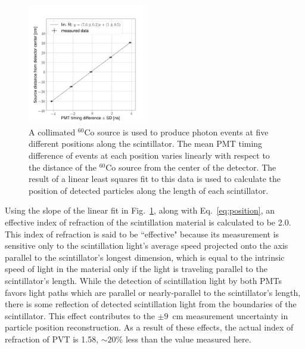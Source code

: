 \documentclass[%
 reprint,
 amsmath,amssymb,
 aps,
 nofootinbib
]{revtex4-1}
\begin{document}
\begin{figure}[]
    \centering    
    \includegraphics[width = 0.47\textwidth]{PMTDifference.png}
    \caption{
    A collimated $^{60}$Co source is used to produce photon events at five different positions along the scintillator.
    The mean PMT timing difference of events at each position varies linearly with respect to the distance of the $^{60}$Co source from the center of the detector. 
    The result of a linear least squares fit to this data is used to calculate the position of detected particles along the length of each scintillator.
    }
    \label{fig:PMTDifference}
\end{figure}

Using the slope of the linear fit in Fig.~\ref{fig:PMTDifference}, along with Eq.~\ref{eq:position}, an effective index of refraction of the scintillation material is calculated to be 2.0.
This index of refraction is said to be ``effective" because its measurement is sensitive only to the scintillation light's average speed projected onto the axis parallel to the scintillator's longest dimension, which is equal to the intrinsic speed of light in the material only if the light is traveling parallel to the scintillator's length.
While the detection of scintillation light by both PMTs favors light paths which are parallel or nearly-parallel to the scintillator's length, there is some reflection of detected scintillation light from the boundaries of the scintillator.
This effect contributes to the $\pm9$~cm measurement uncertainty in particle position reconstruction.
As a result of these effects, the actual index of refraction of PVT is 1.58, $\sim{20}\%$ less than the value measured here.
\end{document}
